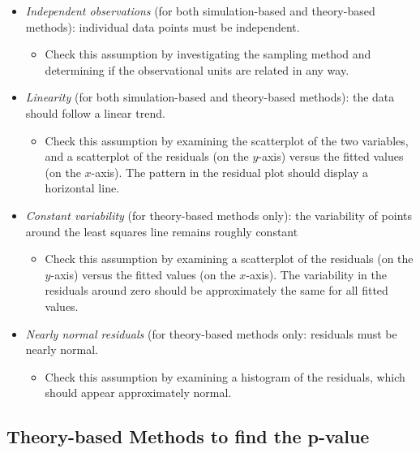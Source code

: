 \documentclass[
]{report}
\providecommand{\tightlist}{%
  \setlength{\itemsep}{0pt}\setlength{\parskip}{0pt}}
\begin{document}
\begin{itemize}
\tightlist
\item
  \emph{Independent observations} (for both simulation-based and theory-based methods): individual data points must be independent.

  \begin{itemize}
  \tightlist
  \item
    Check this assumption by investigating the sampling method and determining if the observational units are related in any way.
  \end{itemize}
\item
  \emph{Linearity} (for both simulation-based and theory-based methods): the data should follow a linear trend.

  \begin{itemize}
  \tightlist
  \item
    Check this assumption by examining the scatterplot of the two variables, and a scatterplot of the residuals (on the \(y\)-axis) versus the fitted values (on the \(x\)-axis). The pattern in the residual plot should display a horizontal line.
  \end{itemize}
\item
  \emph{Constant variability} (for theory-based methods only): the variability of points around the least squares line remains roughly constant

  \begin{itemize}
  \tightlist
  \item
    Check this assumption by examining a scatterplot of the residuals (on the \(y\)-axis) versus the fitted values (on the \(x\)-axis). The variability in the residuals around zero should be approximately the same for all fitted values.
  \end{itemize}
\item
  \emph{Nearly normal residuals} (for theory-based methods only: residuals must be nearly normal.

  \begin{itemize}
  \tightlist
  \item
    Check this assumption by examining a histogram of the residuals, which should appear approximately normal.
  \end{itemize}
\end{itemize}

\subsection*{Theory-based Methods to find the p-value}\label{theory-based-methods-to-find-the-p-value}
\end{document}

